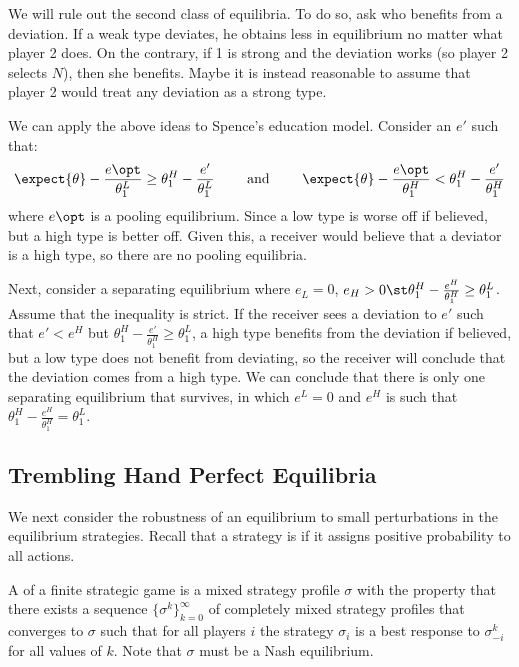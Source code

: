 \documentclass[10pt]{article}
\begin{document}
\begin{example}
	We will rule out the second class of equilibria. To do so, ask who benefits from a deviation. If a weak type deviates, he obtains less in equilibrium no matter what player 2 does. On the contrary, if 1 is strong and the deviation works (so player 2 selects $N$), then she benefits. Maybe it is instead reasonable to assume that player 2 would treat any deviation as a strong type. 
\end{example}

\begin{remark}
	We can apply the above ideas to Spence's education model. Consider an $e'$ such that:\[\expect\{\theta\} - \frac{e\opt}{\theta_1^L} \ge \theta_1^H - \frac{e'}{\theta_1^L} \qquad \text{ and } \qquad \expect\{\theta\} - \frac{e\opt}{\theta_1^H} < \theta_1^H - \frac{e'}{\theta_1^H}\]where $e\opt$ is a pooling equilibrium. Since a low type is worse off if believed, but a high type is better off. Given this, a receiver would believe that a deviator is a high type, so there are no pooling equilibria.
	
	Next, consider a separating equilibrium where $e_L = 0$, $e_H > 0 \st \theta^H_1 - \frac{e^H}{\theta^H_1} \ge \theta_1^L$. Assume that the inequality is strict. If the receiver sees a deviation to $e'$ such that $e' < e^H$ but $\theta^H_1 - \frac{e'}{\theta^H_1} \ge \theta_1^L$, a high type benefits from the deviation if believed, but a low type does not benefit from deviating, so the receiver will conclude that the deviation comes from a high type. We can conclude that there is only one separating equilibrium that survives, in which $e^L = 0$ and $e^H$ is such that $\theta^H_1 - \frac{e^H}{\theta^H_1} = \theta_1^L$.
\end{remark}


\subsection{Trembling Hand Perfect Equilibria}

We next consider the robustness of an equilibrium to small perturbations in the equilibrium strategies. Recall that a strategy is  if it assigns positive probability to all actions.

\begin{definition}
	A  of a finite strategic game is a mixed strategy profile $\sigma$ with the property that there exists a sequence $\{\sigma^k\}_{k=0}^\infty$ of completely mixed strategy profiles that converges to $\sigma$ such that for all players $i$ the strategy $\sigma_i$ is a best response to $\sigma_{-i}^k$ for all values of $k$. Note that $\sigma$ must be a Nash equilibrium. 
\end{definition}
\end{document}
